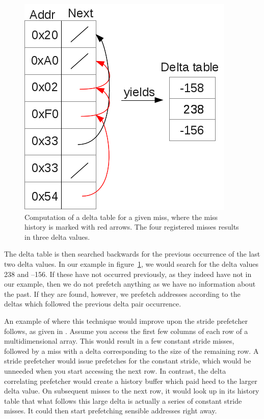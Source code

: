 \begin{figure}[ht]
  \centering
  \includegraphics[scale=0.5]{figures/delta_table_comp.png}
  \caption{\label{fig:deltaTableComp} Computation of a delta table for
    a given miss, where the miss history is marked with red
    arrows. The four registered misses results in three delta values.}
\end{figure}

The delta table is then searched backwards for the previous occurrence
of the last two delta values. In our example in
figure~\ref{fig:deltaTableComp}, we would search for the delta values
238 and --156. If these have not occurred previously, as they indeed
have not in our example, then we do not prefetch anything as we have
no information about the past. If they are found, however, we prefetch
addresses according to the deltas which followed the previous delta
pair occurrence. 

An example of where this technique would improve upon the stride
prefetcher follows, as given in \cite{Nesbit}. Assume you access the
first few columns of each row of a multidimensional array. This would
result in a few constant stride misses, followed by a miss with a
delta corresponding to the size of the remaining row. A stride
prefetcher would issue prefetches for the constant stride, which would
be unneeded when you start accessing the next row.
In contrast, the delta correlating prefetcher would create a history
buffer which paid heed to the larger delta value. On subsequent misses
to the next row, it would look up in its history table that what
follows this large delta is actually a series of constant stride
misses. It could then start prefetching sensible addresses right away.

